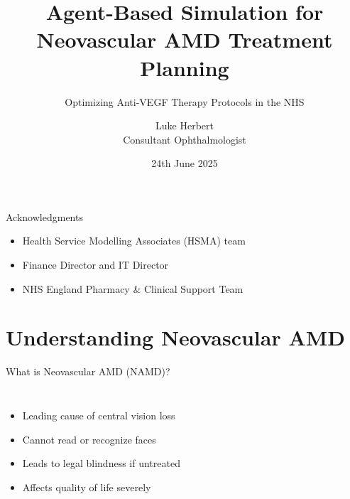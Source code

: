 \documentclass[10pt,aspectratio=169]{beamer}
\title{Agent-Based Simulation for Neovascular AMD Treatment Planning}
\subtitle{Optimizing Anti-VEGF Therapy Protocols in the NHS}
\author{Luke Herbert\\Consultant Ophthalmologist}
\institute{Surrey and Sussex Healthcare NHS Trust}
\date{24th June 2025}
\begin{document}
\maketitle

\begin{frame}{Acknowledgments}
\begin{itemize}
    \item Health Service Modelling Associates (HSMA) team
    \item Finance Director and IT Director
    \item NHS England Pharmacy \& Clinical Support Team
\end{itemize}
\end{frame}

\section{Understanding Neovascular AMD}

\begin{frame}{What is Neovascular AMD (NAMD)?}
\begin{columns}[T]
\begin{itemize}
    \item Leading cause of central vision loss
    \item Cannot read or recognize faces
    \item Leads to legal blindness if untreated
    \item Affects quality of life severely
\end{itemize}

\begin{figure}
    \centering
\end{figure}
\end{columns}
\end{frame}
\end{document}

